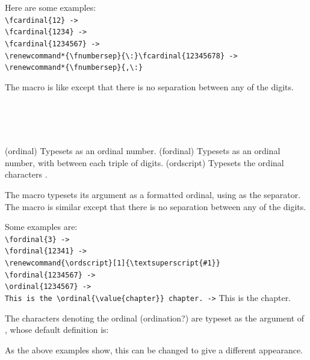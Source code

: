     Here are some examples: \\
\verb?\fcardinal{12} ->?  \\
\verb?\fcardinal{1234} ->?  \\
\verb?\fcardinal{1234567} ->?  \\
\verb?\renewcommand*{\fnumbersep}{\:}\fcardinal{12345678} ->?
\renewcommand*{\fnumbersep}{\:} \\
\verb?\renewcommand*{\fnumbersep}{,\:}?
\renewcommand*{\fnumbersep}{,\:}

    The \cmd{\cardinal} macro is like \cmd{\fcardinal} except that there
is no separation between any of the digits.

\begin{syntax}
\cmd{\ordinal} \\
\cmd{\fordinal} \\
\cmd{\ordscript} \\
\end{syntax}
\glossary(ordinal)%
  {}%
  {Typesets  as an ordinal number.}
\glossary(fordinal)%
  {}%
  {Typesets  as an ordinal number, with  between
   each triple of digits.}
\glossary(ordscript)%
  {}%
  {Typesets the ordinal characters .}

The \cmd{\fordinal} macro typesets its  argument as a formatted
ordinal, using \cmd{\fnumbersep} as the separator. The macro \cmd{\ordinal}
is similar except that there is no separation between any of the digits.

    Some examples are: \\
\verb?\fordinal{3} ->?  \\
\verb?\fordinal{12341} ->?  \\
\verb?\renewcommand{\ordscript}[1]{\textsuperscript{#1}}? \\
\verb?\fordinal{1234567} ->?
  \renewcommand{\ordscript}[1]{\textsuperscript{#1}} \\
\verb?\ordinal{1234567} ->?  \\
\verb?This is the \ordinal{\value{chapter}} chapter. ->? 
  This is the \ordinal{\value{chapter}} chapter.


    The characters denoting the ordinal (ordination?) are typeset as 
the argument of \cmd{\ordscript}, whose default definition is:
\begin{lcode}
\newcommand{\ordscript}[1]{#1}
\end{lcode}
As the above examples show, this can be changed to give a different
appearance.


